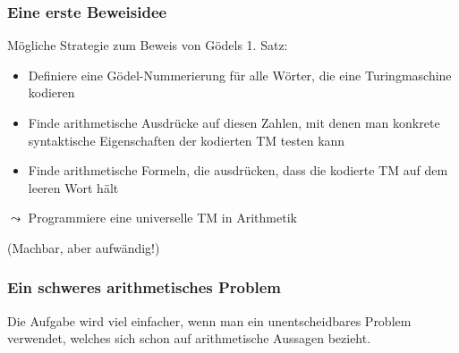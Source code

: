 \documentclass[aspectratio=1610,onlymath]{beamer}
\begin{document}
\begin{frame}\frametitle{Eine erste Beweisidee}

Mögliche Strategie zum Beweis von Gödels 1. Satz:
\begin{itemize}
\item Definiere eine Gödel-Nummerierung für alle Wörter, die eine Turingmaschine kodieren
\item Finde arithmetische Ausdrücke auf diesen Zahlen, mit denen man konkrete syntaktische Eigenschaften der kodierten TM testen kann
\item Finde arithmetische Formeln, die ausdrücken, dass die kodierte TM auf dem leeren Wort hält
\end{itemize}\pause
\alert{$\leadsto$ Programmiere eine universelle TM in Arithmetik}\bigskip

(Machbar, aber aufwändig!)

\end{frame}

\begin{frame}\frametitle{Ein schweres arithmetisches Problem}

Die Aufgabe wird viel einfacher, wenn man ein unentscheidbares Problem verwendet, welches sich schon auf arithmetische Aussagen bezieht.

\pause


\end{frame}
\end{document}
